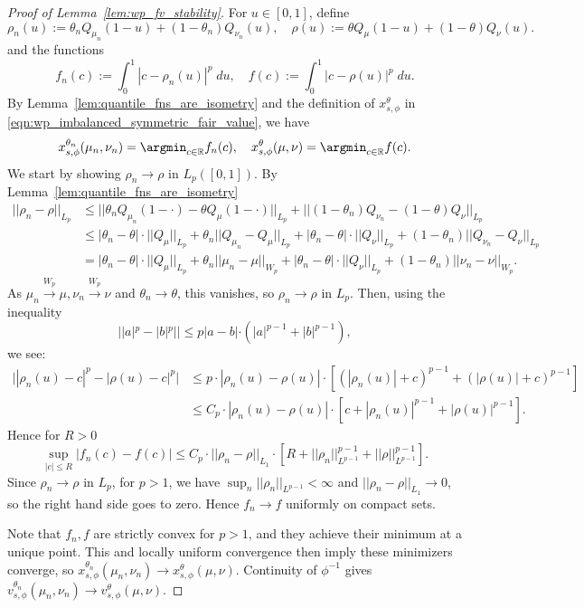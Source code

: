 \begin{proof}[Proof of Lemma~\ref{lem:wp_fv_stability}]
     For $u \in [0,1]$, define
    \[\rho_n(u) := \theta_n Q_{\mu_n}(1-u) + (1-\theta_n) Q_{\nu_n}(u), \quad \rho(u) := \theta Q_{\mu}(1-u) + (1-\theta) Q_{\nu}(u).\]
    \noindent and the functions
    \[f_n(c) := \int_0^1 |c - \rho_n(u)|^p \; du, \quad f(c) := \int_0^1 |c - \rho(u)|^p \; du.\]
    \noindent By Lemma~\ref{lem:quantile_fns_are_isometry} and the definition of $x_{s,\phi}^\theta$ in \eqref{eqn:wp_imbalanced_symmetric_fair_value}, we have
    \[x_{s,\phi}^{\theta_n}(\mu_n, \nu_n) = \argmin_{c \in \mathbb R} f_n(c), \quad x_{s,\phi}^{\theta}(\mu, \nu) = \argmin_{c \in \mathbb R} f(c).\]
    \noindent We start by showing $\rho_n \to \rho$
    in $L_p([0,1])$. By Lemma~\ref{lem:quantile_fns_are_isometry}
    \begin{align*}
        ||\rho_n - \rho||_{L_p} & \leq ||\theta_n Q_{\mu_n}(1-\cdot) - \theta Q_{\mu}(1-\cdot)||_{L_p} + ||(1-\theta_n) Q_{\nu_n} - (1-\theta) Q_{\nu}||_{L_p} \\[5pt]
        & \leq |\theta_n - \theta| \cdot ||Q_{\mu}||_{L_p} + \theta_n || Q_{\mu_n} - Q_{\mu} ||_{L_p} + |\theta_n - \theta| \cdot ||Q_{\nu}||_{L_p} + (1-\theta_n) || Q_{\nu_n} - Q_{\nu} ||_{L_p} \\[5pt]
        & = |\theta_n - \theta| \cdot ||Q_{\mu}||_{L_p} + \theta_n ||\mu_n - \mu||_{W_p} + |\theta_n - \theta| \cdot ||Q_{\nu}||_{L_p} + (1-\theta_n) ||\nu_n - \nu||_{W_p}.
    \end{align*}
    \noindent As $\mu_n \xrightarrow{W_p} \mu, \nu_n \xrightarrow{W_p} \nu$ and $\theta_n \to \theta$,
    this vanishes, so $\rho_n \to \rho$ in $L_p$. Then, using the inequality
    \[||a|^p - |b|^p|| \leq p |a-b| \cdot (|a|^{p-1} + |b|^{p-1}),\]
    \noindent we see:
    \begin{align*}
        \Big| |\rho_n(u) - c|^p - |\rho(u) - c|^p\Big| & \leq p \cdot |\rho_n(u) - \rho(u)| \cdot \left[(|\rho_n(u)| +c)^{p-1} + (|\rho(u)| + c)^{p-1}\right]\\
        & \leq C_p \cdot |\rho_n(u) - \rho(u)| \cdot \left[c + |\rho_n(u)|^{p-1} + |\rho(u)|^{p-1}\right].
    \end{align*}
    \noindent Hence for $R > 0$
    \[\sup_{|c| \leq R} |f_n(c) - f(c)| \leq C_p \cdot ||\rho_n - \rho||_{L_1} \cdot \left[R + ||\rho_n||_{L^{p-1}}^{p-1} + ||\rho||_{L^{p-1}}^{p-1}\right].\]
    \noindent Since $\rho_n \to \rho$ in $L_p$, for $p > 1$, we have $\sup_n ||\rho_n||_{L^{p-1}} < \infty$ and $||\rho_n - \rho||_{L_1} \to 0$, so the right hand
    side goes to zero. Hence $f_n \to f$ uniformly on compact sets.

    Note that $f_n, f$ are strictly convex for $p > 1$, and they achieve their minimum at a
    unique point. This and locally uniform convergence then imply these minimizers converge,
    so $x_{s,\phi}^{\theta_n}(\mu_n,\nu_n)\to x_{s,\phi}^{\theta}(\mu,\nu)$. Continuity of $\phi^{-1}$ gives $v_{s,\phi}^{\theta_n}(\mu_n,\nu_n)\to v_{s,\phi}^{\theta}(\mu,\nu)$. 
\end{proof}
